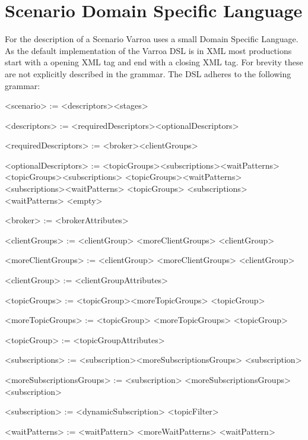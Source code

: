 \chapter{Scenario Domain Specific Language}\label{sec:ScenarioDomainSpecificLanguage}
\setlength{\grammarparsep}{14pt plus 1pt minus 1pt} %
\setlength{\grammarindent}{12em} %
For the description of a Scenario Varroa uses a small Domain Specific Language.
As the default implementation of the Varroa DSL is in XML most productions start with a opening XML tag and end with a closing XML tag. 
For brevity these are not explicitly described in the grammar. 
The DSL adheres to the following grammar:
\begin{grammar}
	<scenario> := 				<descriptors><stages>
	
	<descriptors> :=			<requiredDescriptors><optionalDescriptors>
	
	<requiredDescriptors> := 	<broker><clientGroups>
	
	<optionalDescriptors> := 	<topicGroups><subscriptions><waitPatterns>
								\alt <topicGroups><subscriptions>
								\alt <topicGroups><waitPatterns>
								\alt <subscriptions><waitPatterns>
								\alt <topicGroups>
								\alt <subscriptions>
								\alt <waitPatterns>
								\alt <empty>

	<broker> := <brokerAttributes>

	<clientGroups> := 	<clientGroup> <moreClientGroups>
						\alt <clientGroup>
						
	<moreClientGroups> := <clientGroup> <moreClientGroups>
							\alt <clientGroup>
	
	<clientGroup>  :=   <clientGroupAttributes>

	<topicGroups> := 	<topicGroup><moreTopicGroups>
						\alt <topicGroup>
						
	<moreTopicGroups> := <topicGroup> <moreTopicGroups>
						\alt <topicGroup>
						
	<topicGroup>  :=    <topicGroupAttributes>

	<subscriptions> :=		<subscription><moreSubscriptionsGroups>
							\alt <subscription>
	
	<moreSubscriptionsGroups> := 	<subscription> <moreSubscriptionsGroups>
							\alt <subscription>
	
	<subscription>  :=		<dynamicSubscription>
							\alt <topicFilter>

	<waitPatterns> := <waitPattern> <moreWaitPatterns>
						\alt <waitPattern>
						

\end{grammar}
